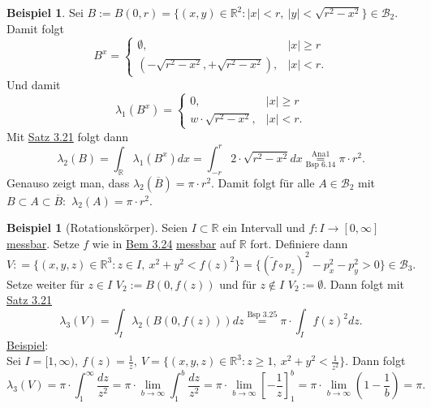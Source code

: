 \documentclass[a4paper]{report}
\newcommand{\R}{\mathbb{R}}
\newcommand{\Borel}{\mathcal{B}}
\newcommand{\toInf}{\rightarrow \infty}
\newcommand{\limToInf}[1]{\lim_{#1 \toInf}}
\newcommand{\jlabel}[1]{\label{j_#1}}
\newcommand{\jshortlink}[1]{\jhyperref{#1}{\text{#1}}}
\newcommand{\jhyperref}[2]{\hyperref[j_#1]{#2}}
\newcommand{\jlink}[1]{\jhyperref{#1}{#1}}
\newcommand{\jabb}[3]{ #1: #2 \rightarrow #3 }
\theoremstyle{plain}
\theoremstyle{definition}
\newtheorem{expl}[thm]{Beispiel}
\begin{document}
{{{{\begin{expl}
\jlabel{Bsp 3.25}
    Sei $B:=B(0,r) = \{(x,y)\in\R^2 : |x| < r, \ |y| < \sqrt{r^2 - x^2}\} \in \Borel_2$. Damit folgt
    \begin{displaymath}
        B^x = \begin{cases} \emptyset, &|x| \ge r\\ (-\sqrt{r^2-x^2},+\sqrt{r^2-x^2}), &|x|<r. \end{cases}
    \end{displaymath}
    Und damit
    \begin{displaymath}
        \lambda_1(B^x) = \begin{cases} 0, &|x|\ge r\\ w\cdot \sqrt{r^2-x^2}, &|x| <r.\end{cases}
    \end{displaymath}
    Mit \jlink{Satz 3.21} folgt dann
    \begin{displaymath}
        \lambda_2(B) = \int_\R \lambda_1(B^x)dx = \int_{-r}^r 2\cdot \sqrt{r^2-x^2}dx \overset{\text{Ana1}}{\underset{\text{Bsp 6.14}}{=}} \pi\cdot r^2.
    \end{displaymath}
    Genauso zeigt man, dass $\lambda_2(\overline{B}) = \pi \cdot r^2$. Damit folgt für alle $A\in\Borel_2$ mit $B\subset A\subset \overline{B}:$ $\lambda_2(A) = \pi\cdot r^2$.
\end{expl}


\begin{expl}[Rotationskörper]
\jlabel{Bsp 3.26}
    Seien $I\subset \R$ ein Intervall und $\jabb{f}{I}{[0,\infty]}$ \jlink{messbar}. Setze $f$ wie in \jlink{Bem 3.24} \jlink{messbar} auf $\R$ fort. Definiere dann
    \begin{displaymath}
        V: =\{(x,y,z)\in\R^3 : z\in I,\ x^2+y^2 < f(z)^2\} = \{(\tilde{f}\circ p_z)^2-p_x^2-p_y^2 > 0\} \in \Borel_3.
    \end{displaymath}
    Setze weiter für $z\in I$ $V_2:= B(0,f(z))$ und für $z\notin I$ $V_2 := \emptyset$. Dann folgt mit \jlink{Satz 3.21}
    \begin{displaymath}
        \lambda_3(V) = \int_I \lambda_2(B(0, f(z)))dz \overset{\jshortlink{Bsp 3.25}}{=} \pi\cdot \int_I f(z)^2dz.
    \end{displaymath}
    \uline{Beispiel}:\\
    Sei $I= [1,\infty), \ f(z) = \frac{1}{z}, \ V = \{(x,y,z)\in \R^3: z\ge 1, \ x^2+y^2<\frac{1}{z^2}\}$. Dann folgt
    \begin{displaymath}
        \lambda_3(V) = \pi \cdot \int_1^\infty \frac{dz}{z^2} = \pi \cdot \limToInf{b} \int_1^b \frac{dz}{z^2} = \pi \cdot \limToInf{b} \left[-\frac{1}{z}\right]_1^b = \pi\cdot \limToInf{b} \left(1 - \frac{1}{b}\right) = \pi.
    \end{displaymath}
\end{expl}

}}}}
\end{document}
